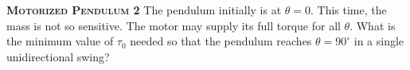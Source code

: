 \begin{problem}
\textbf{\textsc{Motorized Pendulum 2}}
The pendulum initially is at $\theta=0$. This time, the mass is not so sensitive. The motor may supply its full torque for all $\theta$. What is the minimum value of $\tau_0$ needed so that the pendulum reaches $\theta=90^{\circ}$ in a single unidirectional swing?



\end{problem}
    